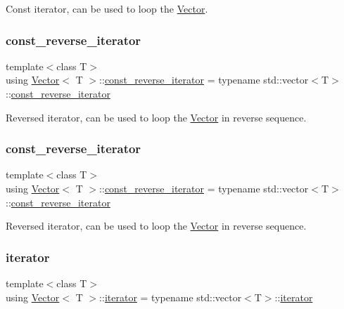 Const iterator, can be used to loop the \hyperlink{classVector}{Vector}. \mbox{\label{classVector_a963c193ac2399eed1cf20d74f559ef2a}} 
\subsubsection{\texorpdfstring{const\+\_\+reverse\+\_\+iterator}{const\_reverse\_iterator}\hspace{0.1cm}{\footnotesize\ttfamily [1/2]}}
{\footnotesize\ttfamily template$<$class T$>$ \\
using \hyperlink{classVector}{Vector}$<$ T $>$\+::\hyperlink{classVector_a963c193ac2399eed1cf20d74f559ef2a}{const\+\_\+reverse\+\_\+iterator} =  typename std\+::vector$<$T$>$\+::\hyperlink{classVector_a963c193ac2399eed1cf20d74f559ef2a}{const\+\_\+reverse\+\_\+iterator}}

Reversed iterator, can be used to loop the \hyperlink{classVector}{Vector} in reverse sequence. \mbox{\label{classVector_a963c193ac2399eed1cf20d74f559ef2a}} 
\subsubsection{\texorpdfstring{const\+\_\+reverse\+\_\+iterator}{const\_reverse\_iterator}\hspace{0.1cm}{\footnotesize\ttfamily [2/2]}}
{\footnotesize\ttfamily template$<$class T$>$ \\
using \hyperlink{classVector}{Vector}$<$ T $>$\+::\hyperlink{classVector_a963c193ac2399eed1cf20d74f559ef2a}{const\+\_\+reverse\+\_\+iterator} =  typename std\+::vector$<$T$>$\+::\hyperlink{classVector_a963c193ac2399eed1cf20d74f559ef2a}{const\+\_\+reverse\+\_\+iterator}}

Reversed iterator, can be used to loop the \hyperlink{classVector}{Vector} in reverse sequence. \mbox{\label{classVector_a45531016f99e90887e0f890f2da943e4}} 
\subsubsection{\texorpdfstring{iterator}{iterator}\hspace{0.1cm}{\footnotesize\ttfamily [1/2]}}
{\footnotesize\ttfamily template$<$class T$>$ \\
using \hyperlink{classVector}{Vector}$<$ T $>$\+::\hyperlink{classVector_a45531016f99e90887e0f890f2da943e4}{iterator} =  typename std\+::vector$<$T$>$\+::\hyperlink{classVector_a45531016f99e90887e0f890f2da943e4}{iterator}}

